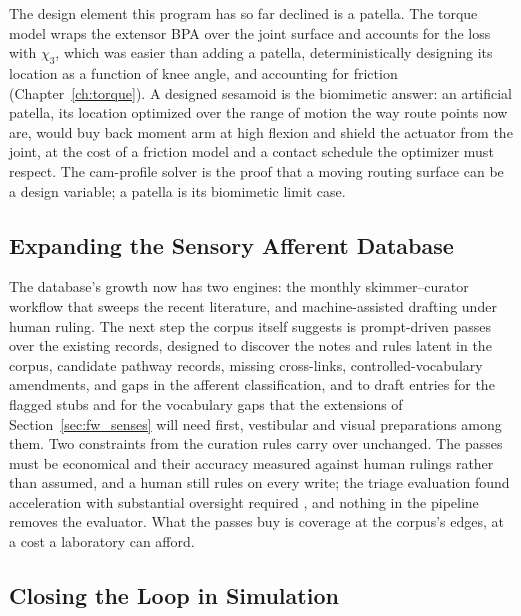 The design element this program has so far declined is a patella. The torque model wraps the extensor BPA over the joint surface and accounts for the loss with $\chi_{3}$, which was easier than adding a patella, deterministically designing its location as a function of knee angle, and accounting for friction (Chapter~\ref{ch:torque}). A designed sesamoid is the biomimetic answer: an artificial patella, its location optimized over the range of motion the way route points now are, would buy back moment arm at high flexion and shield the actuator from the joint, at the cost of a friction model and a contact schedule the optimizer must respect. The cam-profile solver is the proof that a moving routing surface can be a design variable; a patella is its biomimetic limit case.

\subsection{Expanding the Sensory Afferent Database}\label{sec:fw_database}

The database's growth now has two engines: the monthly skimmer--curator workflow that sweeps the recent literature, and machine-assisted drafting under human ruling. The next step the corpus itself suggests is prompt-driven passes over the existing records, designed to discover the notes and rules latent in the corpus, candidate pathway records, missing cross-links, controlled-vocabulary amendments, and gaps in the afferent classification, and to draft entries for the flagged stubs and for the vocabulary gaps that the extensions of Section~\ref{sec:fw_senses} will need first, vestibular and visual preparations among them. Two constraints from the curation rules carry over unchanged. The passes must be economical and their accuracy measured against human rulings rather than assumed, and a human still rules on every write; the triage evaluation found acceleration with substantial oversight required \citep{bolen_using_2024}, and nothing in the pipeline removes the evaluator. What the passes buy is coverage at the corpus's edges, at a cost a laboratory can afford.

\subsection{Closing the Loop in Simulation}\label{sec:fw_pipeline}\label{sec:fw_cpg}

